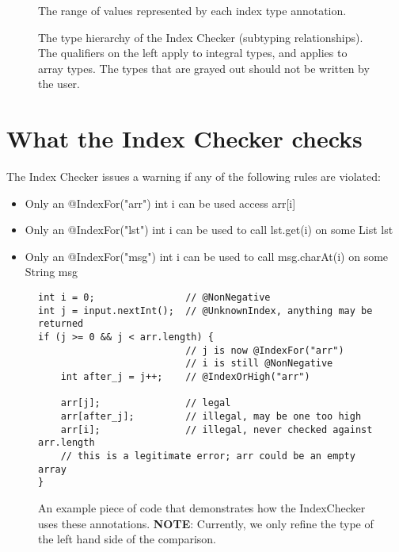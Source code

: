 \begin{figure}
\caption{The range of values represented by each index type annotation.}
\label{fig-index-figure}
\end{figure}

\begin{figure}
\caption{The type hierarchy of the Index Checker (subtyping relationships).
The qualifiers on the left apply to integral types, and
 applies to array types.
The types that are grayed out should not be written by the user.}
\label{fig-index-heirarchy}
\end{figure}

\section{What the Index Checker checks\label{index-checks}}

The Index Checker issues a warning if any of the following rules are violated:
\begin{itemize}
\item Only an @IndexFor("arr") int i can be used access arr[i]
\item Only an @IndexFor("lst") int i can be used to call lst.get(i) on some List lst
\item Only an @IndexFor("msg") int i can be used to call msg.charAt(i) on some String msg
\end{itemize}

\begin{figure}
\begin{Verbatim}
int i = 0;                // @NonNegative
int j = input.nextInt();  // @UnknownIndex, anything may be returned
if (j >= 0 && j < arr.length) {
                          // j is now @IndexFor("arr")
                          // i is still @NonNegative
    int after_j = j++;    // @IndexOrHigh("arr")

    arr[j];               // legal
    arr[after_j];         // illegal, may be one too high
    arr[i];               // illegal, never checked against arr.length
    // this is a legitimate error; arr could be an empty array
}
\end{Verbatim}
\caption{An example piece of code that demonstrates how the IndexChecker uses these annotations. \textbf{NOTE}: Currently, we only refine the type of the left hand side of the comparison.}
\label{fig-index-hierarchy}
\end{figure}


